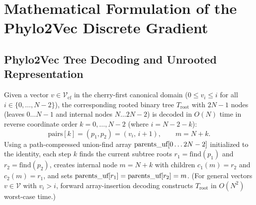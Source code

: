 \documentclass[11pt,a4paper]{article}
\makeatletter
\DeclareRobustCommand{\_}{\ifmmode\nfss@text{\textunderscore}\else\textunderscore\allowbreak\fi}
\theoremstyle{definition}
\makeatother
\begin{document}
\section{Mathematical Formulation of the Phylo2Vec Discrete Gradient}
\label{sec:math}

\subsection{Phylo2Vec Tree Decoding and Unrooted Representation}
Given a vector $v \in \mathcal{V}_{\text{cf}}$ in the cherry-first canonical domain ($0 \le v_i \le i$ for all $i \in \{0, \dots, N-2\}$), the corresponding rooted binary tree $T_{\text{root}}$ with $2N-1$ nodes (leaves $0 \dots N-1$ and internal nodes $N \dots 2N-2$) is decoded in $O(N)$ time in reverse coordinate order $k = 0, \dots, N-2$ (where $i = N - 2 - k$):
\begin{equation}
\text{pairs}[k] = (p_1, p_2) = (v_i, \, i + 1), \qquad m = N + k.
\end{equation}
Using a path-compressed union-find array $\text{parents\_uf}[0 \dots 2N-2]$ initialized to the identity, each step $k$ finds the current subtree roots $r_1 = \text{find}(p_1)$ and $r_2 = \text{find}(p_2)$, creates internal node $m = N + k$ with children $c_1(m) = r_2$ and $c_2(m) = r_1$, and sets $\text{parents\_uf}[r_1] = \text{parents\_uf}[r_2] = m$. (For general vectors $v \in \mathcal{V}$ with $v_i > i$, forward array-insertion decoding constructs $T_{\text{root}}$ in $O(N^2)$ worst-case time.)
\end{document}
